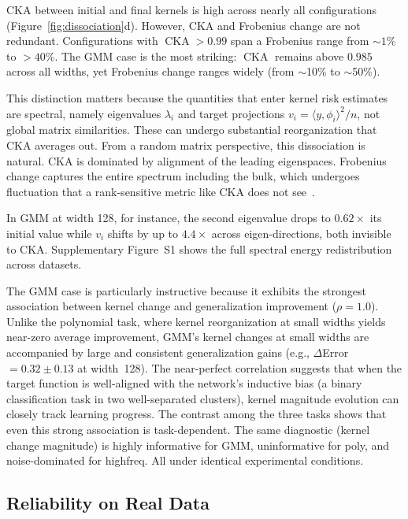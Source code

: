 \documentclass[10pt]{article}
\newcommand{\cca}{{\operatorname{CKA}}}
\begin{document}
CKA between initial and final kernels is high across nearly all configurations (Figure~\ref{fig:dissociation}d).  However, CKA and Frobenius change are not redundant.  Configurations with $\cca>0.99$ span a Frobenius range from $\sim1\%$ to $>40\%$.  The GMM case is the most striking: $\cca$ remains above $0.985$ across all widths, yet Frobenius change ranges widely (from $\sim$10\% to $\sim$50\%).

This distinction matters because the quantities that enter kernel risk estimates~\citep{canatar2021spectral} are spectral, namely eigenvalues $\lambda_{i}$ and target projections $v_{i}=\langle y,\phi_{i}\rangle^{2}/n$, not global matrix similarities.  These can undergo substantial reorganization that CKA averages out.  From a random matrix perspective, this dissociation is natural. CKA is dominated by alignment of the leading eigenspaces. Frobenius change captures the entire spectrum including the bulk, which undergoes fluctuation that a rank-sensitive metric like CKA does not see~\citep{el1998concentration,vyas2023statistical}.

In GMM at width 128, for instance, the second eigenvalue drops to $0.62\times$ its initial value while $v_{i}$ shifts by up to $4.4\times$ across eigen-directions, both invisible to CKA.  Supplementary Figure~S1 shows the full spectral energy redistribution across datasets.

The GMM case is particularly instructive because it exhibits the strongest association between kernel change and generalization improvement ($\rho=1.0$).  Unlike the polynomial task, where kernel reorganization at small widths yields near-zero average improvement, GMM's kernel changes at small widths are accompanied by large and consistent generalization gains (e.g., $\Delta$Error $=0.32\pm0.13$ at width~128).  The near-perfect correlation suggests that when the target function is well-aligned with the network's inductive bias (a binary classification task in two well-separated clusters), kernel magnitude evolution can closely track learning progress.  The contrast among the three tasks shows that even this strong association is task-dependent. The same diagnostic (kernel change magnitude) is highly informative for GMM, uninformative for poly, and noise-dominated for highfreq. All under identical experimental conditions.

\subsection{Reliability on Real Data}
\label{sec:real}
\end{document}
